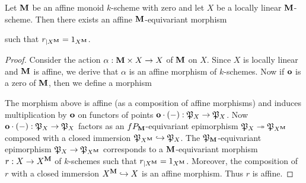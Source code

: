\begin{proposition}\label{proposition:retraction_for_monoids_with_zero}
Let $\mathbf{M}$ be an affine monoid $k$-scheme with zero and let $X$ be a locally linear $\mathbf{M}$-scheme. Then there exists an affine $\mathbf{M}$-equivariant morphism
\begin{center}
\end{center}
such that $r_{\mid X^{\mathbf{M}}} = 1_{X^{\mathbf{M}}}$.
\end{proposition}
\begin{proof}
Consider the action $\alpha:\mathbf{M}\times X\rightarrow X$ of $\mathbf{M}$ on $X$. Since $X$ is locally linear and $\mathbf{M}$ is affine, we derive that $\alpha$ is an affine morphism of $k$-schemes. Now if $\mathbf{o}$ is a zero of $\mathbf{M}$, then we define a morphism 
\begin{center}
\end{center}
The morphism above is affine (as a composition of affine morphisms) and induces multiplication by $\mathbf{o}$ on functors of points $\mathbf{o}\cdot(-):{\mathfrak P}_X\rightarrow {\mathfrak P}_X$. Now $\mathbf{o}\cdot (-):{\mathfrak P}_X\rightarrow {\mathfrak P}_X$ factors as an $fP_{\mathbf{M}}$-equivariant epimorphism ${\mathfrak P}_X\twoheadrightarrow {\mathfrak P}_{X^{\mathbf{M}}}$ composed with a closed immersion ${\mathfrak P}_{X^{\mathbf{M}}}\hookrightarrow {\mathfrak P}_X$. The ${\mathfrak P}_{\mathbf{M}}$-equivariant epimorphism ${\mathfrak P}_X\rightarrow {\mathfrak P}_{X^{\mathbf{M}}}$ corresponds to a $\mathbf{M}$-equivariant morphism $r:X\rightarrow X^{\mathbf{M}}$ of $k$-schemes such that $r_{\mid X^{\mathbf{M}}} = 1_{X^{\mathbf{M}}}$. Moreover, the composition of $r$ with a closed immersion $X^{\mathbf{M}}\hookrightarrow X$ is an affine morphism. Thus $r$ is affine.
\end{proof}

